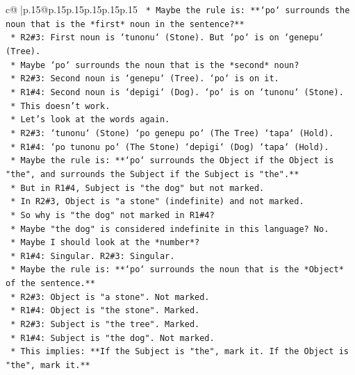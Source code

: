 \documentclass{article}
\begin{document}
{\begin{supertabular}{c@{$\;$}|p{.15\linewidth}@{}p{.15\linewidth}p{.15\linewidth}p{.15\linewidth}p{.15\linewidth}p{.15\linewidth}}
{{{\texttt{        *   Maybe the rule is: **`po` surrounds the noun that is the *first* noun in the sentence?**} \\
\texttt{        *   R2\#3: First noun is `tunonu` (Stone). But `po` is on `genepu` (Tree).} \\
\texttt{        *   Maybe `po` surrounds the noun that is the *second* noun?} \\
\texttt{        *   R2\#3: Second noun is `genepu` (Tree). `po` is on it.} \\
\texttt{        *   R1\#4: Second noun is `depigi` (Dog). `po` is on `tunonu` (Stone).} \\
\texttt{        *   This doesn't work.} \\
\texttt{        *   Let's look at the words again.} \\
\texttt{        *   R2\#3: `tunonu` (Stone) `po genepu po` (The Tree) `tapa` (Hold).} \\
\texttt{        *   R1\#4: `po tunonu po` (The Stone) `depigi` (Dog) `tapa` (Hold).} \\
\texttt{        *   Maybe the rule is: **`po` surrounds the Object if the Object is "the", and surrounds the Subject if the Subject is "the".**} \\
\texttt{        *   But in R1\#4, Subject is "the dog" but not marked.} \\
\texttt{        *   In R2\#3, Object is "a stone" (indefinite) and not marked.} \\
\texttt{        *   So why is "the dog" not marked in R1\#4?} \\
\texttt{        *   Maybe "the dog" is considered indefinite in this language? No.} \\
\texttt{        *   Maybe I should look at the *number*?} \\
\texttt{        *   R1\#4: Singular. R2\#3: Singular.} \\
\texttt{        *   Maybe the rule is: **`po` surrounds the noun that is the *Object* of the sentence.**} \\
\texttt{        *   R2\#3: Object is "a stone". Not marked.} \\
\texttt{        *   R1\#4: Object is "the stone". Marked.} \\
\texttt{        *   R2\#3: Subject is "the tree". Marked.} \\
\texttt{        *   R1\#4: Subject is "the dog". Not marked.} \\
\texttt{        *   This implies: **If the Subject is "the", mark it. If the Object is "the", mark it.**} \\
}}}
\end{supertabular}}
\end{document}

